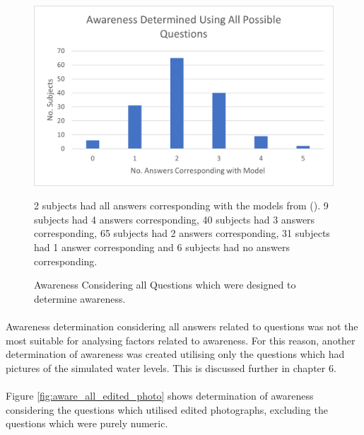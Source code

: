 \begin{figure}[H]
    \centering
    \includegraphics{fig_results/aware_all.png}
    \caption{Awareness Considering all Questions which were designed to determine awareness.}{  2 subjects had all answers corresponding with the models from (\cite{kartverket_se_2020}). 9 subjects had 4 answers corresponding, 40 subjects had 3 answers corresponding, 65 subjects had 2 answers corresponding, 31 subjects had 1 answer corresponding and 6 subjects had no answers corresponding. }
    \label{fig:aware_all_qs}
\end{figure}
\paragraph{}

Awareness determination considering all answers related to questions was not the most suitable for analysing factors related to awareness. For this reason, another determination of awareness was created utilising only the questions which had pictures of the simulated water levels. This is discussed further in chapter 6. 
\paragraph{}
Figure \ref{fig:aware_all_edited_photo} shows determination of awareness considering the questions which utilised edited photographs, excluding the questions which were purely numeric. 

